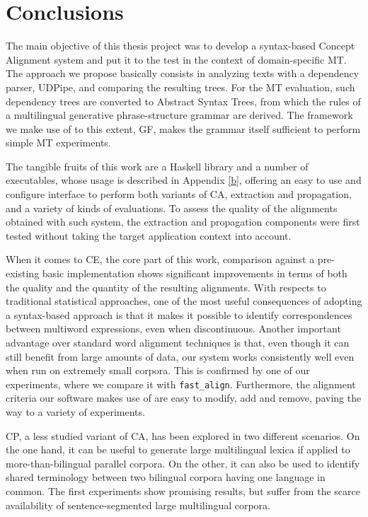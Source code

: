 \chapter{Conclusions} \label{ch6}

The main objective of this thesis project was to develop a syntax-based Concept Alignment system and put it to the test in the context of domain-specific MT. The approach we propose basically consists in analyzing texts with a dependency parser, UDPipe, and comparing the resulting trees. For the MT evaluation, such dependency trees are converted to Abstract Syntax Trees, from which the rules of a multilingual generative phrase-structure grammar are derived. The framework we make use of to this extent, GF, makes the grammar itself sufficient to perform simple MT experiments.\smallskip

The tangible fruits of this work are a Haskell library and a number of executables, whose usage is described in Appendix \ref{b}, offering an easy to use and configure interface to perform both variants of CA, extraction and propagation, and a variety of kinds of evaluations. 
To assess the quality of the alignments obtained with such system, the extraction and propagation components were first tested without taking the target application context into account. \smallskip

When it comes to CE, the core part of this work, comparison against a pre-existing basic implementation shows significant improvements in terms of both the quality and the quantity of the resulting alignments. 
With respects to traditional statistical approaches, one of the most useful consequences of adopting a syntax-based approach is that it makes it possible to identify correspondences between multiword expressions, even when discontinuous. 
Another important advantage over standard word alignment techniques is that, even though it can still benefit from large amounts of data, our system works consistently well even when run on extremely small corpora. This is confirmed by one of our experiments, where we compare it with \texttt{fast\_align}. 
Furthermore, the alignment criteria our software makes use of are easy to modify, add and remove, paving the way to a variety of experiments. \smallskip

CP, a less studied variant of CA, has been explored in two different scenarios. On the one hand, it can be useful to generate large multilingual lexica if applied to more-than-bilingual parallel corpora. On the other, it can also be used to identify shared terminology between two bilingual corpora having one language in common. The first experiments show promising results, but suffer from the scarce availability of sentence-segmented large multilingual corpora. \smallskip

